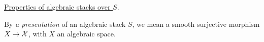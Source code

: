 % 
% 

 \underline{Properties of algebraic stacks over $S$}.

 By \emph{a presentation} of an algebraic stack $S$, we mean a smooth surjective morphism
 $X\to \mathcal{X}$, with $X$ an algebraic space.

